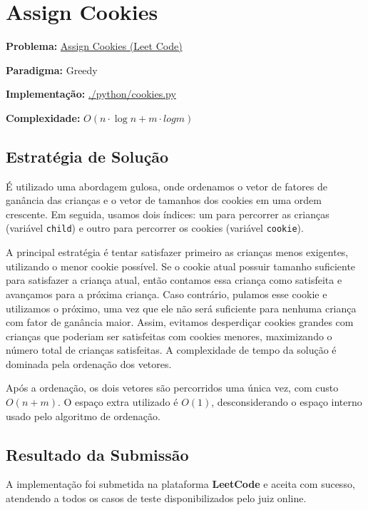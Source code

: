 \documentclass[
    12pt,
    oneside,
    a4paper,
    brazil
]{abntex2}
\begin{document}
\chapter{Assign Cookies}

\textbf{Problema:} \href{https://leetcode.com/problems/assign-cookies/description/}{Assign Cookies (Leet Code)}

\textbf{Paradigma:} Greedy

\textbf{Implementação:} \href{https://github.com/BccMaterial/AA-Trabalho/blob/main/python/cookies.py}{./python/cookies.py}

\textbf{Complexidade:} $O(n \cdot \log{n} + m \cdot log{m})$

\section{Estratégia de Solução}

É utilizado uma abordagem gulosa, onde ordenamos o vetor de fatores de ganância das crianças e o vetor de tamanhos dos cookies em uma ordem crescente. Em seguida, usamos dois índices: um para percorrer as crianças (variável \texttt{child}) e outro para percorrer os cookies (variável \texttt{cookie}).

A principal estratégia é tentar satisfazer primeiro as crianças menos exigentes, utilizando o menor cookie possível. Se o cookie atual possuir tamanho suficiente para satisfazer a criança atual, então contamos essa criança como satisfeita e avançamos para a próxima criança. Caso contrário, pulamos esse cookie e utilizamos o próximo, uma vez que ele não será suficiente para nenhuma criança com fator de ganância maior. Assim, evitamos desperdiçar cookies grandes com crianças que poderiam ser satisfeitas com cookies menores, maximizando o número total de crianças satisfeitas. A complexidade de tempo da solução é dominada pela ordenação dos vetores.

Após a ordenação, os dois vetores são percorridos uma única vez, com custo $O(n + m)$. O espaço extra utilizado é $O(1)$, desconsiderando o espaço interno usado pelo algoritmo de ordenação.

\section{Resultado da Submissão}

A implementação foi submetida na plataforma \textbf{LeetCode} e aceita com sucesso, atendendo a todos os casos de teste disponibilizados pelo juiz online.
\end{document}
